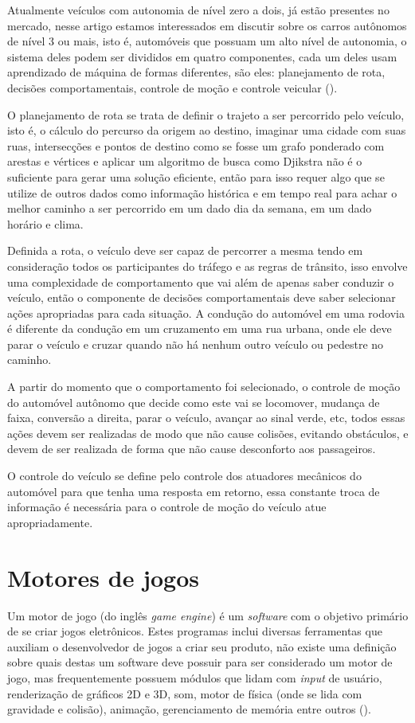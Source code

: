 Atualmente veículos com autonomia de nível zero a dois, já estão presentes no mercado, nesse artigo estamos interessados em discutir sobre os carros autônomos de nível 3 ou mais, isto é, automóveis que possuam um alto nível de autonomia, o sistema deles podem ser divididos em quatro componentes, cada um deles usam aprendizado de máquina de formas diferentes, são eles: planejamento de rota, decisões comportamentais, controle de moção e controle veicular (). 

O planejamento de rota se trata de definir o trajeto a ser percorrido pelo veículo, isto é, o cálculo do percurso da origem ao destino, imaginar uma cidade com suas ruas, intersecções e pontos de destino como se fosse um grafo ponderado com arestas e vértices e aplicar um algoritmo de busca como Djikstra não é o suficiente para gerar uma solução eficiente, então para isso requer algo que se utilize de outros dados como informação histórica e em tempo real para achar o melhor caminho a ser percorrido em um dado dia da semana, em um dado horário e clima.

Definida a rota, o veículo deve ser capaz de percorrer a mesma tendo em consideração todos os participantes do tráfego e as regras de trânsito, isso envolve uma complexidade de comportamento que vai além de apenas saber conduzir o veículo, então o componente de decisões comportamentais deve saber selecionar ações apropriadas para cada situação. A condução do automóvel em uma rodovia é diferente da condução em um cruzamento em uma rua urbana, onde ele deve parar o veículo e cruzar quando não há nenhum outro veículo ou pedestre no caminho.

A partir do momento que o comportamento foi selecionado, o controle de moção do automóvel autônomo que decide como este vai se locomover, mudança de faixa, conversão a direita, parar o veículo, avançar ao sinal verde, etc, todos essas ações devem ser realizadas de modo que não cause colisões, evitando obstáculos, e devem de ser realizada de forma que não cause desconforto aos passageiros.

O controle do veículo se define pelo controle dos atuadores mecânicos do automóvel para que tenha uma resposta em retorno, essa constante troca de informação é necessária para o controle de moção do veículo atue apropriadamente.

\section{Motores de jogos}
Um motor de jogo (do inglês \textit{game engine}) é um \textit{software} com o objetivo primário de se criar jogos eletrônicos. Estes programas inclui diversas ferramentas que auxiliam o desenvolvedor de jogos a criar seu produto, não existe uma definição sobre quais destas um software deve possuir para ser considerado um motor de jogo, mas frequentemente possuem módulos que lidam com \textit{input} de usuário, renderização de gráficos 2D e 3D, som, motor de física (onde se lida com gravidade e colisão), animação, gerenciamento de memória entre outros (). 


